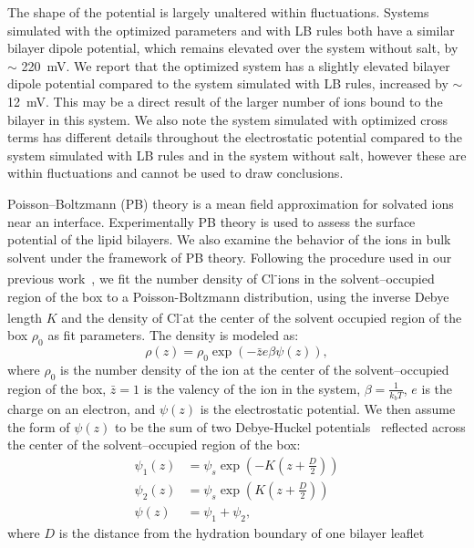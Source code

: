 \documentclass[12pt,openany,final]{book}
\newcommand{\cl}{Cl\textsuperscript{-}}
\begin{document}
The shape of the potential
is largely unaltered within fluctuations. Systems simulated with the
optimized parameters and with LB rules both have a similar bilayer dipole potential, 
which remains elevated over
the system without salt, by $\sim$ 220~mV.  We report 
that the optimized system has a slightly
elevated bilayer dipole potential compared to the system simulated with
LB rules, increased by $\sim$ 12~mV.
This may be a direct result of the larger number of
ions bound to the bilayer in this system.  We also note the system simulated with optimized cross terms
has different details
throughout the electrostatic potential compared to the system simulated with LB rules and in the
system without salt, however these are within fluctuations and cannot be used to draw conclusions.

Poisson--Boltzmann (PB) theory is a mean field approximation for
solvated ions near an interface. Experimentally PB theory is used to
assess the surface potential of the lipid bilayers. We also examine
the behavior of the ions in bulk solvent under the framework of PB
theory. Following the procedure used in our previous
work~\cite{saunders:2019}, we fit the number density of \cl ions in
the solvent--occupied region of the box to a Poisson-Boltzmann
distribution, using the inverse Debye length $K$ and the density of
\cl at the center of the solvent occupied region of the box $\rho_0$
as fit parameters. 
The density is modeled as:
\begin{equation}
    \label{eq:gcdens}
    \rho (z)= \rho _{0} \exp{(- \bar{z} e \beta \psi (z))},
\end{equation}
where $\rho_0$ is the number density of the ion at the center of the
solvent--occupied region of the box, $\bar{z}=1$ is the valency of the
ion in the system, $\beta=\frac{1}{k_b T}$, $e$ is the charge on an
electron, and $\psi(z)$ is the electrostatic potential. We then assume
the form of $\psi(z)$ to be the sum of two Debye-Huckel
potentials~\cite{israelachvili:2011:intermol} reflected across the
center of the solvent--occupied region of the box:
\begin{equation}
    \begin{split}
    \psi_1(z)&=\psi_s \exp(-K(z+\frac{D}{2})) \\
    \psi_2(z)&=\psi_s \exp(K(z+\frac{D}{2})) \\
    \psi(z)&=\psi_1 + \psi_2\text{,}
    \label{eq:gcpot}
\end{split}
\end{equation}
where $D$ is the distance from the hydration boundary of one bilayer leaflet
\end{document}
